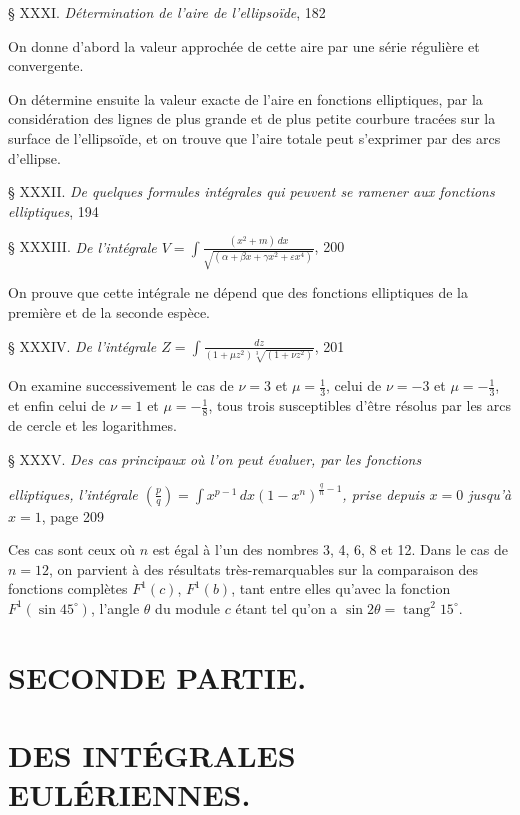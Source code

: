 \documentclass{article}
\begin{document}
§ XXXI. \emph{Détermination de l'aire de l'ellipsoïde}, 182

On donne d'abord la valeur approchée de cette aire par une série régulière et convergente.

On détermine ensuite la valeur exacte de l'aire en fonctions elliptiques, par la considération des lignes de plus grande et de plus petite courbure tracées sur la surface de l'ellipsoïde, et on trouve que l'aire totale peut s'exprimer par des arcs d'ellipse.

§ XXXII. \emph{De quelques formules intégrales qui peuvent se ramener aux fonctions elliptiques}, 194

§ XXXIII. \emph{De l'intégrale $\displaystyle V=\int\frac{(x^{2}+m)\,dx}{\sqrt{(\alpha+\beta x+\gamma x^{2}+\varepsilon x^{4})}}$}, 200

On prouve que cette intégrale ne dépend que des fonctions elliptiques de la première et de la seconde espèce.

§ XXXIV. \emph{De l'intégrale $\displaystyle Z=\int\frac{dz}{(1+\mu z^{2})\sqrt[3]{(1+\nu z^{2})}}$}, 201

On examine successivement le cas de $\nu=3$ et $\mu=\frac{1}{3}$, celui de $\nu=-3$ et $\mu=-\frac{1}{3}$, et enfin celui de $\nu=1$ et $\mu=-\frac{1}{8}$, tous trois susceptibles d'être résolus par les arcs de cercle et les logarithmes.

§ XXXV. \emph{Des cas principaux où l'on peut évaluer, par les fonctions}

\emph{elliptiques, l'intégrale $\left(\frac{p}{q}\right)=\displaystyle\int x^{p-1}\,dx(1-x^{n})^{\frac{q}{n}-1}$, prise depuis $x=0$ jusqu'à $x=1$}, page 209

Ces cas sont ceux où $n$ est égal à l'un des nombres 3, 4, 6, 8 et 12. Dans le cas de $n=12$, on parvient à des résultats très-remarquables sur la comparaison des fonctions complètes $F^{1}(c)$, $F^{1}(b)$, tant entre elles qu'avec la fonction $F^{1}(\sin 45^{\circ})$, l'angle $\theta$ du module $c$ étant tel qu'on a $\sin 2\theta=\operatorname{tang}^{2}15^{\circ}$.

\section*{SECONDE PARTIE.}

\section*{DES INTÉGRALES EULÉRIENNES.}
\end{document}
